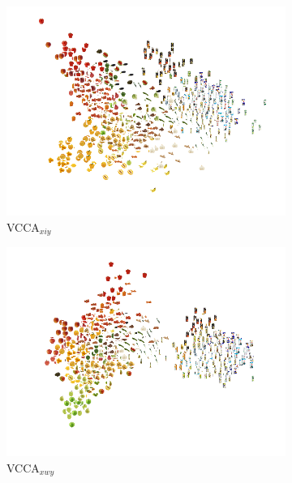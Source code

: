 \begin{figure}[t]
     \begin{subfigure}[b]{0.3\textwidth}
         \centering
         \includegraphics[width=\textwidth]{figures_and_tables/latent_space_visualizations/pca_latents_vcca_xiy_seed2.png}
         \caption{VCCA$_{x i y}$}
         \label{fig:pca_vcca_xiy}
     \end{subfigure} 
     \begin{subfigure}[b]{0.3\textwidth}
         \centering
         \includegraphics[width=\textwidth]{figures_and_tables/latent_space_visualizations/pca_latents_vcca_xwy_seed2.png}
         \caption{VCCA$_{x w y}$}
         \label{fig:pca_vcca_xwy}
     \end{subfigure} 
     \begin{subfigure}[b]{0.3\textwidth}

\end{subfigure}
\end{figure}
